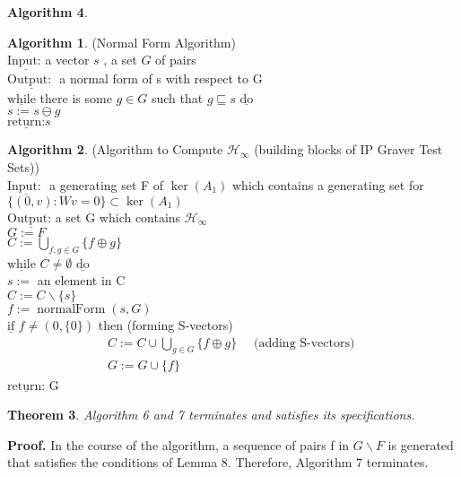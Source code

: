 \documentclass{article}
\theoremstyle{plain}
\newtheorem{theorem}{Theorem}[section]
\theoremstyle{definition}
\newtheorem{algorithm}[theorem]{Algorithm}
\begin{document}
\begin{algorithm}
\begin{algorithm}(Normal Form Algorithm)  \\
$ \underline{\text {Input: }}$a vector  $s$ , a set  $G$  of pairs \\
$\underline{\text {Output: }}$ a normal form of  s  with respect to  G  \\
$\underline{\text{while}}$ there is some  $g \in G$  such that  $g \sqsubseteq s \underline{\text { do }} $ \\
$s:=s\ominus g$ \\
$\underline{\text {return:}}  s$ \end{algorithm}

\begin{algorithm} (Algorithm to Compute $\mathcal{H}_{\infty}$ (building blocks of IP Graver Test Sets)) \\
$ \underline{\text {Input: }}$ a generating set F of $\operatorname{ker}(A_1)$ which contains a generating set for
$\{(0,v) : W v = 0\} \subset \operatorname{ker}(A_1)$ \\
$\underline{\text {Output: }}$a set G which contains $\mathcal{H}_{\infty}$ \\
$ G:=F $ \\
 $C:=\bigcup_{f, g \in G} \{f\oplus g\} $ \\
$\underline{\text{while}}$ $ C \neq \emptyset \underline{\text { do }} $\\
\indent  $s:=$  an element in  C \\
\indent $C:=C \backslash\{s\}$ \\ 
\indent $f:=\operatorname{normalForm}(s, G) $\\
\indent $\underline{\text{if}}$  $f \neq (0,\{0\})$  then (forming S-vectors)
$$
\begin{array}{l}
C:=C \cup \bigcup_{g \in G}\{f\oplus g\} \quad \text { (adding S-vectors) } \\
G:=G \cup\{f\}
\end{array}
$$
\indent $\underline{\text{return:}}$  G \end{algorithm}

\begin{theorem} Algorithm 6 and 7 terminates and satisfies its specifications.\end{theorem}

\noindent\textbf{Proof.} In the course of the algorithm, a sequence of pairs  f  in  $G \backslash F$  is generated that satisfies the conditions of Lemma 8. Therefore, Algorithm 7  terminates.


\end{algorithm}
\end{document}
